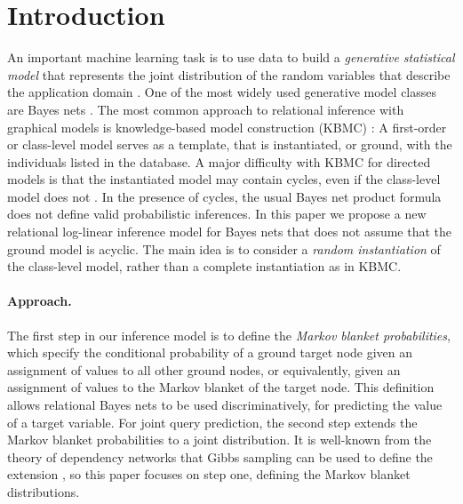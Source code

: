 \documentclass[twoside,leqno,twocolumn]{article}
\begin{document}
\section{Introduction}
An important machine learning task is to use data to build a {\em generative statistical model} that represents the joint distribution of the random variables that describe the application domain \cite{getoor-intro}. One of the most widely used generative model classes are Bayes nets \cite{Pearl1988}. 
The most common approach to relational inference with graphical models is knowledge-based model construction (KBMC) \cite{Ngo1997,Wellman1992}:  A first-order or class-level model serves as a template, that is instantiated, or ground, with the individuals listed in the database. 
 A major difficulty with KBMC
for directed models
is that the instantiated model may contain cycles, even if the class-level model does not \cite{Domingos2007,Taskar2002,Getoor2007c}. In the presence of cycles, the usual Bayes net product formula does not define valid probabilistic inferences. In this paper we propose a new relational log-linear inference model for Bayes nets that does not assume that the ground model is acyclic. The main  idea is to consider a {\em random instantiation} of the class-level model, rather than a complete instantiation as in KBMC.

\paragraph{Approach.} The first step in our inference model is to define the {\em Markov blanket probabilities}, which specify the conditional probability of a ground target node given an assignment of values to all other ground nodes, or equivalently, given an assignment of values to the Markov blanket of the target node. This definition allows relational Bayes nets to be used discriminatively, for predicting the value of a target variable. For joint query prediction, the second step extends the Markov blanket probabilities to a joint distribution. It is well-known from the theory of dependency networks that Gibbs sampling can be used to define the extension \cite{Heckerman2000,bib:jensen-chapter,Natarajan2012,Lowd2012}, so this paper focuses on step one, defining the Markov blanket distributions. 
\end{document}
